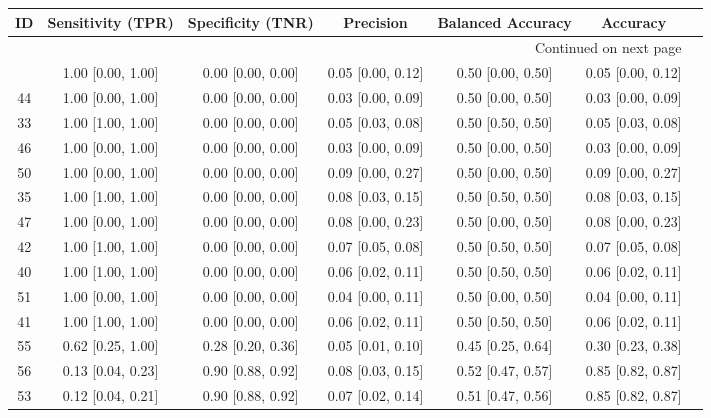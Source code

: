 \documentclass[8pt]{article}
\begin{document}
\begin{center}
\begin{footnotesize}
\begin{longtable}{|ccccccc|}
\toprule
 ID &  Sensitivity (TPR) &  Specificity (TNR) &          Precision &  Balanced Accuracy &           Accuracy \\
\midrule
\endhead
\midrule
\multicolumn{6}{r}{{Continued on next page}} \\
\midrule
\endfoot

\bottomrule
\endlastfoot
 45 &  1.00 [0.00, 1.00] &  0.00 [0.00, 0.00] &  0.05 [0.00, 0.12] &  0.50 [0.00, 0.50] &  0.05 [0.00, 0.12] \\
 44 &  1.00 [0.00, 1.00] &  0.00 [0.00, 0.00] &  0.03 [0.00, 0.09] &  0.50 [0.00, 0.50] &  0.03 [0.00, 0.09] \\
 33 &  1.00 [1.00, 1.00] &  0.00 [0.00, 0.00] &  0.05 [0.03, 0.08] &  0.50 [0.50, 0.50] &  0.05 [0.03, 0.08] \\
 46 &  1.00 [0.00, 1.00] &  0.00 [0.00, 0.00] &  0.03 [0.00, 0.09] &  0.50 [0.00, 0.50] &  0.03 [0.00, 0.09] \\
 50 &  1.00 [0.00, 1.00] &  0.00 [0.00, 0.00] &  0.09 [0.00, 0.27] &  0.50 [0.00, 0.50] &  0.09 [0.00, 0.27] \\
 35 &  1.00 [1.00, 1.00] &  0.00 [0.00, 0.00] &  0.08 [0.03, 0.15] &  0.50 [0.50, 0.50] &  0.08 [0.03, 0.15] \\
 47 &  1.00 [0.00, 1.00] &  0.00 [0.00, 0.00] &  0.08 [0.00, 0.23] &  0.50 [0.00, 0.50] &  0.08 [0.00, 0.23] \\
 42 &  1.00 [1.00, 1.00] &  0.00 [0.00, 0.00] &  0.07 [0.05, 0.08] &  0.50 [0.50, 0.50] &  0.07 [0.05, 0.08] \\
 40 &  1.00 [1.00, 1.00] &  0.00 [0.00, 0.00] &  0.06 [0.02, 0.11] &  0.50 [0.50, 0.50] &  0.06 [0.02, 0.11] \\
 51 &  1.00 [0.00, 1.00] &  0.00 [0.00, 0.00] &  0.04 [0.00, 0.11] &  0.50 [0.00, 0.50] &  0.04 [0.00, 0.11] \\
 41 &  1.00 [1.00, 1.00] &  0.00 [0.00, 0.00] &  0.06 [0.02, 0.11] &  0.50 [0.50, 0.50] &  0.06 [0.02, 0.11] \\
 55 &  0.62 [0.25, 1.00] &  0.28 [0.20, 0.36] &  0.05 [0.01, 0.10] &  0.45 [0.25, 0.64] &  0.30 [0.23, 0.38] \\
 56 &  0.13 [0.04, 0.23] &  0.90 [0.88, 0.92] &  0.08 [0.03, 0.15] &  0.52 [0.47, 0.57] &  0.85 [0.82, 0.87] \\
 53 &  0.12 [0.04, 0.21] &  0.90 [0.88, 0.92] &  0.07 [0.02, 0.14] &  0.51 [0.47, 0.56] &  0.85 [0.82, 0.87] \\

\end{longtable}
\end{footnotesize}
\end{center}
\end{document}
